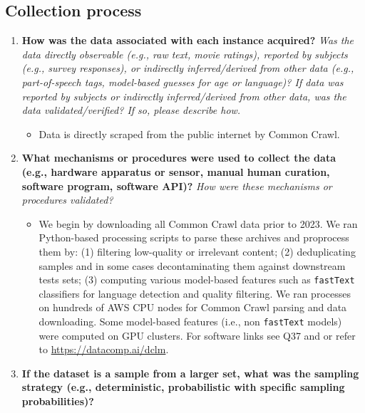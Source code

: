 \documentclass{article}
\newcommand{\ourcode}{\url{https://datacomp.ai/dclm}\xspace}
\newcommand{\fasttext}{\texttt{fastText}\xspace}
\newcommand{\commoncrawl}{Common Crawl\xspace}
\begin{document}
\subsection{Collection process}
\label{datasheet:collection}

\begin{enumerate}[label=Q\arabic*, resume]

\item \textbf{How was the data associated with each instance acquired?} \textit{Was the data directly observable (e.g., raw text, movie ratings), reported by subjects (e.g., survey responses), or indirectly inferred/derived from other data (e.g., part-of-speech tags, model-based guesses for age or language)? If data was reported by subjects or indirectly inferred/derived from other data, was the data validated/verified? If so, please describe how.}

\begin{itemize}
\item Data is directly scraped from the public internet by \commoncrawl.
\end{itemize}

\item \textbf{What mechanisms or procedures were used to collect the data (e.g., hardware apparatus or sensor, manual human curation, software program, software API)?} \textit{How were these mechanisms or procedures validated?}

\begin{itemize}
\item We begin by downloading all \commoncrawl data prior to 2023. We ran Python-based processing scripts to parse these archives and proprocess them by: (1) filtering low-quality or irrelevant content; (2) deduplicating samples and in some cases decontaminating them against downstream tests sets; (3) computing various model-based features such as \fasttext classifiers for language detection and quality filtering.
We ran processes on hundreds of AWS CPU nodes for \commoncrawl parsing and data downloading.
Some model-based features (i.e., non \fasttext models) were computed on GPU clusters. For software links see Q37 and  or refer to \ourcode.
\end{itemize}

\item \textbf{If the dataset is a sample from a larger set, what was the sampling strategy (e.g., deterministic, probabilistic with specific sampling probabilities)?}


\end{enumerate}
\end{document}
